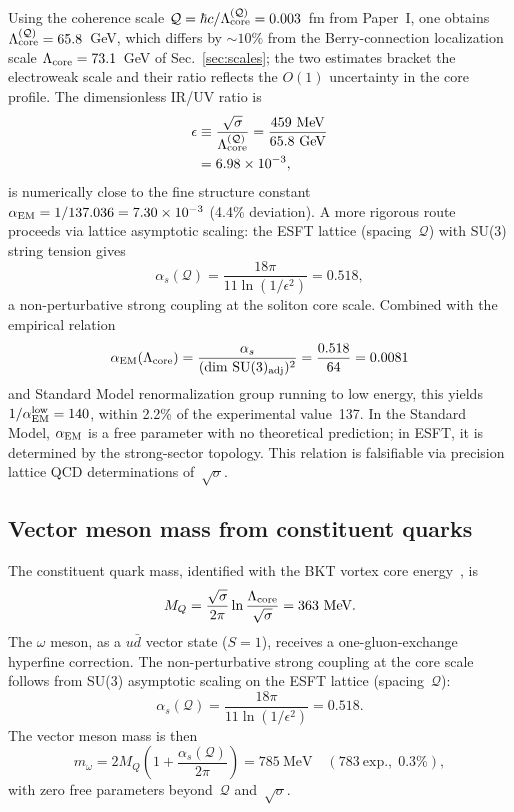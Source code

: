\documentclass[a4paper,12pt]{article}
\newcommand{\Qoppa}{\mathcal{Q}} %
\newcommand{\qoppa}{\Qoppa} %
\begin{document}
Using the coherence scale $\qoppa = \hbar c / \Lambda_{\rm core}^{(\qoppa)}
= 0.003$~fm from Paper~I, one obtains
$\Lambda_{\rm core}^{(\qoppa)} = 65.8$~GeV, which differs by $\sim\!10\%$
from the Berry-connection localization scale $\Lambda_{\rm core} = 73.1$~GeV
of Sec.~\ref{sec:scales}; the two estimates bracket the electroweak scale
and their ratio reflects the $O(1)$ uncertainty in the core profile.
The dimensionless IR/UV ratio is
\begin{align}
\epsilon &\equiv \frac{\sqrt{\sigma}}{\Lambda_{\rm core}^{(\qoppa)}}
 = \frac{459~{\rm MeV}}{65.8~{\rm GeV}} \nonumber\\
 &= 6.98 \times 10^{-3},
\end{align}
is numerically close to the fine structure constant $\alpha_{\rm EM} = 1/137.036 = 7.30 \times 10^{-3}$
(4.4\% deviation). A more rigorous route proceeds via lattice
asymptotic scaling: the ESFT lattice (spacing~$\Qoppa$) with
SU(3) string tension gives
\begin{equation}
\alpha_s(\Qoppa) = \frac{18\pi}{11\ln(1/\epsilon^2)} = 0.518,
\end{equation}
a non-perturbative strong coupling at the soliton core scale.
Combined with the empirical relation
\begin{equation}
\alpha_{\rm EM}(\Lambda_{\rm core})
 = \frac{\alpha_s}{(\dim\,\mathrm{SU}(3)_{\rm adj})^2}
 = \frac{0.518}{64} = 0.0081
\end{equation}
and Standard Model renormalization group running to low energy, this
yields $1/\alpha_{\rm EM}^{\rm low} = 140$, within 2.2\% of the
experimental value~137. In the Standard Model, $\alpha_{\rm EM}$ is
a free parameter with no theoretical prediction; in ESFT, it is
determined by the strong-sector topology. This relation is
falsifiable via precision lattice QCD determinations of~$\sqrt{\sigma}$.

\subsection{Vector meson mass from constituent quarks}

The constituent quark mass, identified with the BKT vortex core
energy~\cite{PaperI}, is
\begin{equation}
M_Q = \frac{\sqrt{\sigma}}{2\pi}\ln\frac{\Lambda_{\rm core}}{\sqrt{\sigma}}
= 363~\text{MeV}.
\end{equation}
The $\omega$ meson, as a $u\bar{d}$ vector state ($S=1$), receives a
one-gluon-exchange hyperfine correction. The non-perturbative strong
coupling at the core scale follows from SU(3) asymptotic scaling on
the ESFT lattice (spacing~$\Qoppa$):
\begin{equation}
\alpha_s(\Qoppa) = \frac{18\pi}{11\ln(1/\epsilon^2)} = 0.518.
\end{equation}
The vector meson mass is then
\begin{equation}
m_\omega = 2M_Q\!\left(1+\frac{\alpha_s(\Qoppa)}{2\pi}\right)
= 785~\text{MeV}\quad (783~\text{exp.},\;0.3\%),
\end{equation}
with zero free parameters beyond~$\Qoppa$ and~$\sqrt{\sigma}$.
\end{document}
